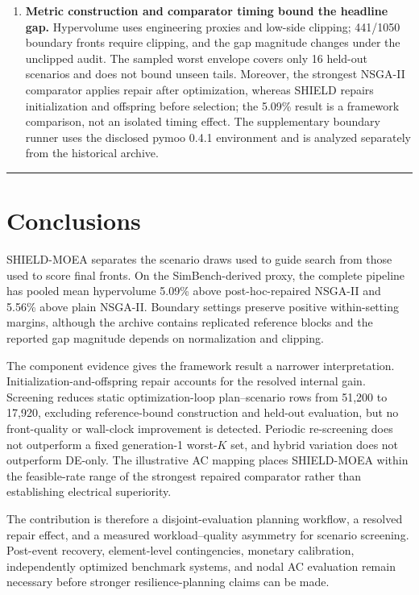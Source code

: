 \documentclass[energies,article,submit,moreauthors]{Definitions/mdpi}
\begin{document}
\begin{enumerate}
\item
  \textbf{Metric construction and comparator timing bound the headline gap.} Hypervolume uses engineering proxies and low-side clipping; 441/1050 boundary fronts require clipping, and the gap magnitude changes under the unclipped audit. The sampled worst envelope covers only 16 held-out scenarios and does not bound unseen tails. Moreover, the strongest NSGA-II comparator applies repair after optimization, whereas SHIELD repairs initialization and offspring before selection; the 5.09\% result is a framework comparison, not an isolated timing effect. The supplementary boundary runner uses the disclosed pymoo 0.4.1 environment and is analyzed separately from the historical archive.
\end{enumerate}

\begin{center}\rule{0.5\linewidth}{0.5pt}\end{center}

\section{Conclusions}\label{conclusions}

SHIELD-MOEA separates the scenario draws used to guide search from those used to score final fronts. On the SimBench-derived proxy, the complete pipeline has pooled mean hypervolume 5.09\% above post-hoc-repaired NSGA-II and 5.56\% above plain NSGA-II. Boundary settings preserve positive within-setting margins, although the archive contains replicated reference blocks and the reported gap magnitude depends on normalization and clipping.

The component evidence gives the framework result a narrower interpretation. Initialization-and-offspring repair accounts for the resolved internal gain. Screening reduces static optimization-loop plan--scenario rows from 51,200 to 17,920, excluding reference-bound construction and held-out evaluation, but no front-quality or wall-clock improvement is detected. Periodic re-screening does not outperform a fixed generation-1 worst-\(K\) set, and hybrid variation does not outperform DE-only. The illustrative AC mapping places SHIELD-MOEA within the feasible-rate range of the strongest repaired comparator rather than establishing electrical superiority.

The contribution is therefore a disjoint-evaluation planning workflow, a resolved repair effect, and a measured workload--quality asymmetry for scenario screening. Post-event recovery, element-level contingencies, monetary calibration, independently optimized benchmark systems, and nodal AC evaluation remain necessary before stronger resilience-planning claims can be made.
\end{document}
